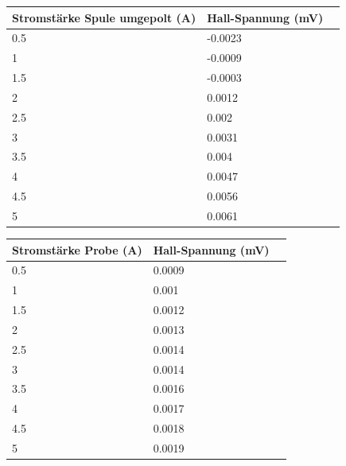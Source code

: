 \documentclass[titlepage=firstcover, captions=tableheading]{scrartcl}
\begin{document}
\begin{center}
    \begin{tabular}{lll}
        \toprule
        Stromstärke Spule umgepolt (A) & Hall-Spannung (mV) \\
        \midrule 
          0.5      &  -0.0023\\
          1        &  -0.0009\\
          1.5      &  -0.0003\\ 
          2        &  0.0012\\ 
          2.5      &  0.002\\ 
          3        &  0.0031\\ 
          3.5      &  0.004\\ 
          4        &  0.0047\\ 
          4.5      &  0.0056\\ 
          5        &  0.0061 \\ 
        \bottomrule
    \end{tabular}
\end{center}

\begin{center}
    \begin{tabular}{lll}
        \toprule
        Stromstärke Probe (A) & Hall-Spannung (mV) \\
        \midrule 
          0.5      & 0.0009 \\
          1        & 0.001 \\
          1.5      & 0.0012 \\ 
          2        & 0.0013 \\ 
          2.5      & 0.0014\\  
          3        & 0.0014 \\ 
          3.5      & 0.0016 \\ 
          4        & 0.0017 \\ 
          4.5      & 0.0018 \\ 
          5        & 0.0019 \\ 
        \bottomrule
    \end{tabular}
\end{center}
\end{document}
